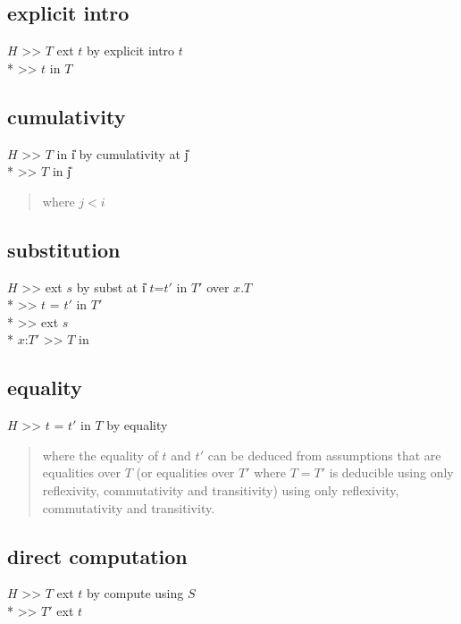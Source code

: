 \subsection*{explicit intro}
\goal $H$ >> $T$ ext $t$ by explicit intro $t$ \\*
\subgoal >> $t$ in $T$

\subsection*{cumulativity}
\goal $H$ >> $T$ in \U{i}{} by cumulativity at \U{j} \\*
\subgoal >> $T$ in \U{j}
\begin{quote}\rm
where $j<i$
\end{quote}

\subsection*{substitution}
\goal $H$ >> 
              ext $s$
              by subst at \U{i} $t$=$t'$ in $T'$ over $x.T$ \\*
\subgoal >> $t$ = $t'$ in $T'$ \\*
\subgoal >>  ext $s$\\*
\subgoal $x$:$T'$ >> $T$ in \Ui



\subsection*{equality}
\goal $H$ >> $t$ = $t'$ in $T$ by equality
\begin{quote}\rm
where the equality of $t$ and $t'$ can be deduced from assumptions that are
equalities over $T$ (or equalities over $T'$ where $T = T'$ is deducible
using only reflexivity, commutativity and transitivity)
using only reflexivity, commutativity and transitivity.
\end{quote}

\subsection*{direct computation}

\goal $H$ >>  $T$
              ext $t$
              by compute using $S$ \\*
\subgoal >> $T'$ ext $t$

